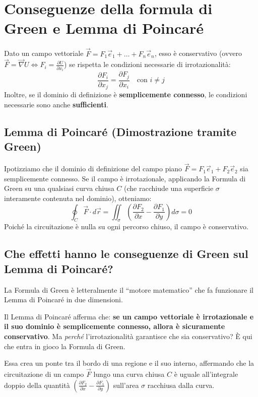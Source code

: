 \section{Conseguenze della formula di Green e Lemma di Poincaré}
Dato un campo vettoriale $\vec{F} = F_1 \vec{e}_1 + \dots + F_n \vec{e}_n$, esso è conservativo (ovvero $\vec{F} = \vec{\nabla} U \iff F_i = \frac{\partial U}{\partial x_i}$) se rispetta le condizioni necessarie di irrotazionalità:
\begin{equation*}
    \frac{\partial F_i}{\partial x_j} = \frac{\partial F_j}{\partial x_i} \quad \text{con } i \neq j
\end{equation*}
Inoltre, se il dominio di definizione è \textbf{semplicemente connesso}, le condizioni necessarie sono anche \textbf{sufficienti}.

\subsection{Lemma di Poincaré (Dimostrazione tramite Green)}

Ipotizziamo che il dominio di definizione del campo piano $\vec{F} = F_1 \vec{e}_1 + F_2 \vec{e}_2$ sia semplicemente connesso.
Se il campo è irrotazionale, applicando la Formula di Green su una qualsiasi curva chiusa $C$ (che racchiude una superficie $\sigma$ interamente contenuta nel dominio), otteniamo:
\begin{equation*}
    \oint_C \vec{F} \cdot d\vec{r} = \iint_\sigma \left( \frac{\partial F_2}{\partial x} - \frac{\partial F_1}{\partial y} \right) d\sigma = 0
\end{equation*}
Poiché la circuitazione è nulla su ogni percorso chiuso, il campo è conservativo.

\subsection{Che effetti hanno le conseguenze di Green sul Lemma di Poincaré?}

La Formula di Green è letteralmente il ``motore matematico'' che fa funzionare il Lemma di Poincaré in due dimensioni. 

Il Lemma di Poincaré afferma che: \textbf{se un campo vettoriale è irrotazionale e il suo dominio è semplicemente connesso, allora è sicuramente conservativo}. Ma \emph{perché} l'irrotazionalità garantisce che sia conservativo? È qui che entra in gioco la Formula di Green. 

Essa crea un ponte tra il bordo di una regione e il suo interno, affermando che la circuitazione di un campo $\vec{F}$ lungo una curva chiusa $C$ è uguale all'integrale doppio della quantità $\left(\frac{\partial F_2}{\partial x} - \frac{\partial F_1}{\partial y}\right)$ sull'area $\sigma$ racchiusa dalla curva. 

